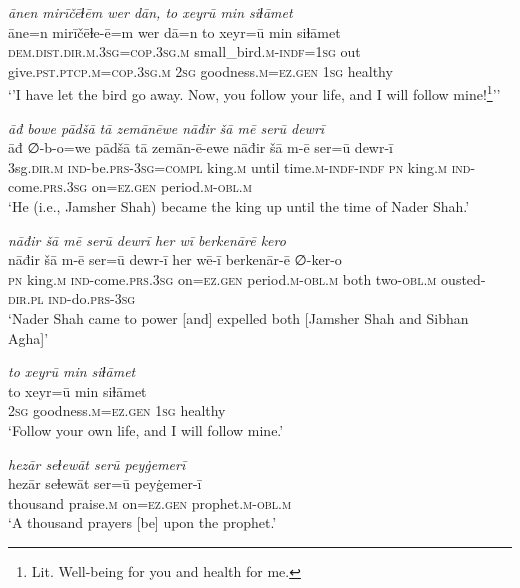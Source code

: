 \ea \label{DP.50}
\textit{ānen mirīčēɫēm wer dān, to xeyrū min siɫāmet} \\ 
\gll āne=n mirīčēɫe-ē=m wer dā=n to xeyr=ū min siɫāmet \\ 
 \textsc{dem.dist}\textsc{.dir}\textsc{.m}\textsc{.3sg}\textsc{=cop}\textsc{.3sg}\textsc{.m} small\_bird\textsc{.m}\textsc{-indf}\textsc{=1sg} out give\textsc{.pst}\textsc{.ptcp}\textsc{.m}\textsc{=cop}\textsc{.3sg}\textsc{.m} \textsc{2sg} goodness\textsc{.m}\textsc{=ez}\textsc{.gen} \textsc{1sg} healthy \\ 
\glt `’I have let the bird go away. Now, you follow your life, and I will follow mine!\footnote{Lit. Well-being for you and health for me.}’'
\z 
 
\ea \label{DP.53}
\textit{āđ bowe pādšā tā zemānēwe nāđir šā mē serū dewrī} \\ 
\gll āđ ∅-b-o=we pādšā tā zemān-ē-ewe nāđir šā m-ē ser=ū dewr-ī \\ 
 3sg\textsc{.dir}\textsc{.m} \textsc{ind-}be\textsc{.prs}\textsc{-3sg}\textsc{=\textsc{compl}} king\textsc{.m} until time\textsc{.m}\textsc{-indf}\textsc{-indf} \textsc{pn} king\textsc{.m} \textsc{ind-}come\textsc{.prs}\textsc{.3sg} on\textsc{=ez}\textsc{.gen} period\textsc{.m}\textsc{-obl}\textsc{.m} \\ 
\glt `He (i.e., Jamsher Shah) became the king up until the time of Nader Shah.'
\z 
 
\ea \label{DP.54}
\textit{nāđir šā mē serū dewrī her wī berkenārē kero} \\ 
\gll nāđir šā m-ē ser=ū dewr-ī her wē-ī berkenār-ē ∅-ker-o \\ 
 \textsc{pn} king\textsc{.m} \textsc{ind-}come\textsc{.prs}\textsc{.3sg} on\textsc{=ez}\textsc{.gen} period\textsc{.m}\textsc{-obl}\textsc{.m} both two\textsc{-obl}\textsc{.m} ousted\textsc{-dir}\textsc{.pl} \textsc{ind-}do\textsc{.prs}\textsc{-3sg} \\ 
\glt `Nader Shah came to power [and] expelled both [Jamsher Shah and Sibhan Agha]'
\z 
 
\ea \label{DP.55}
\textit{to xeyrū min siɫāmet} \\ 
\gll to xeyr=ū min siɫāmet \\ 
 \textsc{2sg} goodness\textsc{.m}\textsc{=ez}\textsc{.gen} \textsc{1sg} healthy \\ 
\glt `Follow your own life, and I will follow mine.'
\z 
 
\ea \label{DP.56}
\textit{hezār seɫewāt serū peyġemerī} \\ 
\gll hezār seɫewāt ser=ū peyġemer-ī \\ 
 thousand praise\textsc{.m} on\textsc{=ez}\textsc{.gen} prophet\textsc{.m}\textsc{-obl}\textsc{.m} \\ 
\glt `A thousand prayers [be] upon the prophet.'
\z 

